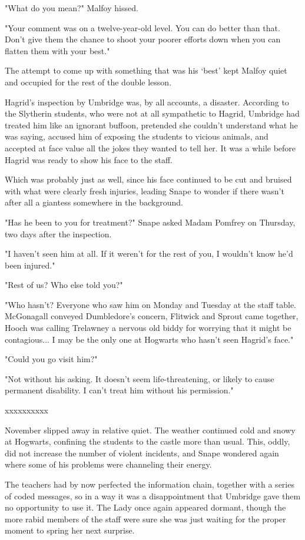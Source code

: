 \documentclass[a4paper,11pt]{article}
\begin{document}
"What do you mean?" Malfoy hissed.

"Your comment was on a twelve-year-old level. You can do better than that. Don't give them the chance to shoot your poorer efforts down when you can flatten them with your best."

The attempt to come up with something that was his `best' kept Malfoy quiet and occupied for the rest of the double lesson.

Hagrid's inspection by Umbridge was, by all accounts, a disaster. According to the Slytherin students, who were not at all sympathetic to Hagrid, Umbridge had treated him like an ignorant buffoon, pretended she couldn't understand what he was saying, accused him of exposing the students to vicious animals, and accepted at face value all the jokes they wanted to tell her. It was a while before Hagrid was ready to show his face to the staff.

Which was probably just as well, since his face continued to be cut and bruised with what were clearly fresh injuries, leading Snape to wonder if there wasn't after all a giantess somewhere in the background.

"Has he been to you for treatment?" Snape asked Madam Pomfrey on Thursday, two days after the inspection.

"I haven't seen him at all. If it weren't for the rest of you, I wouldn't know he'd been injured."

"Rest of us? Who else told you?"

"Who hasn't? Everyone who saw him on Monday and Tuesday at the staff table. McGonagall conveyed Dumbledore's concern, Flitwick and Sprout came together, Hooch was calling Trelawney a nervous old biddy for worrying that it might be contagious... I may be the only one at Hogwarts who hasn't seen Hagrid's face."

"Could you go visit him?"

"Not without his asking. It doesn't seem life-threatening, or likely to cause permanent disability. I can't treat him without his permission."

xxxxxxxxxx

November slipped away in relative quiet. The weather continued cold and snowy at Hogwarts, confining the students to the castle more than usual. This, oddly, did not increase the number of violent incidents, and Snape wondered again where some of his problems were channeling their energy.

The teachers had by now perfected the information chain, together with a series of coded messages, so in a way it was a disappointment that Umbridge gave them no opportunity to use it. The Lady once again appeared dormant, though the more rabid members of the staff were sure she was just waiting for the proper moment to spring her next surprise.
\end{document}
